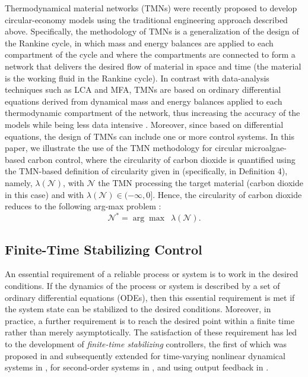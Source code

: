 Thermodynamical material networks (TMNs) were recently proposed \cite{zocco2023thermodynamical,zocco2024unification,zocco2022circularity,zocco2024circular} to develop circular-economy models using the traditional engineering approach described above. Specifically, the methodology of TMNs is a generalization of the design of the Rankine cycle, in which mass and energy balances are applied to each compartment of the cycle and where the compartments are connected to form a network that delivers the desired flow of material in space and time (the material is the working fluid in the Rankine cycle). In contrast with data-analysis techniques such as LCA and MFA, TMNs are based on ordinary differential equations derived from dynamical mass and energy balances applied to each thermodynamic compartment of the network, thus increasing the accuracy of the models while being less data intensive \cite{zocco2023thermodynamical,zocco2022circularity}. Moreover, since based on differential equations, the design of TMNs can include one or more control systems. In this paper, we illustrate the use of the TMN methodology for circular microalgae-based carbon control, where the circularity of carbon dioxide is quantified using the TMN-based definition of circularity given in \cite{zocco2024circular} (specifically, in Definition 4), namely, $\lambda(\mathcal{N})$, with $\mathcal{N}$ the TMN processing the target material (carbon dioxide in this case) and with $\lambda(\mathcal{N}) \in (-\infty,0]$. Hence, the circularity of carbon dioxide reduces to the following arg-max problem \cite{zocco2024circular}:
\begin{equation}\label{eq:circProblem}
\mathcal{N}^* = \arg \max \,\,\, \lambda(\mathcal{N}).  
\end{equation}
      
       



\subsection{Finite-Time Stabilizing Control}
An essential requirement of a reliable process or system is to work in the desired conditions. If the dynamics of the process or system is described by a set of ordinary differential equations (ODEs), then this essential requirement is met if the system state can be stabilized to the desired conditions. Moreover, in practice, a further requirement is to reach the desired point within a finite time rather than merely asymptotically. The satisfaction of these requirement has led to the development of \emph{finite-time stabilizing} controllers, the first of which was proposed in \cite{Roxin1966} and subsequently extended for time-varying nonlinear dynamical systems in \cite{moulay2008finite,haddad2008finite}, for second-order systems in \cite{bhat1998continuous}, and using output feedback in \cite{hong2001output}.    

